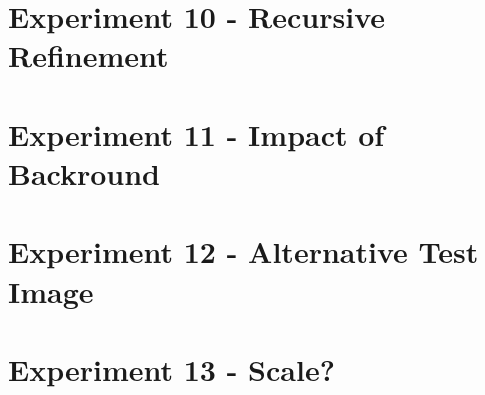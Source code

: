 \section{Experiment 10 - Recursive Refinement}


\section{Experiment 11 - Impact of Backround}


\section{Experiment 12 - Alternative Test Image}


\section{Experiment 13 - Scale?}


